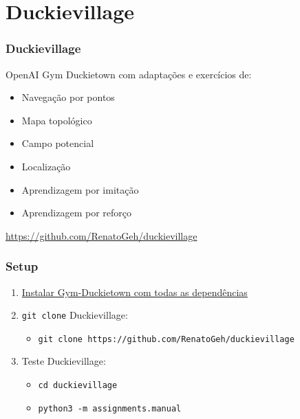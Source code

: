 \documentclass{beamer}
\begin{document}
\section{Duckievillage}

\begin{frame}
  \frametitle{Duckievillage}

  OpenAI Gym Duckietown com adaptações e exercícios de:
  \vspace{0.5cm}

  \begin{itemize}
    \item Navegação por pontos
    \item Mapa topológico
    \item Campo potencial
    \item Localização
    \item Aprendizagem por imitação
    \item Aprendizagem por reforço
  \end{itemize}
  \vspace{0.5cm}

  \url{https://github.com/RenatoGeh/duckievillage}
\end{frame}

\begin{frame}
  \frametitle{Setup}

  \begin{enumerate}
    \item \href{https://github.com/RenatoGeh/duckievillage}{Instalar Gym-Duckietown com todas as
      dependências}
    \item \texttt{git clone} Duckievillage:
      \begin{itemize}
        \item \scriptsize\texttt{git clone https://github.com/RenatoGeh/duckievillage}
      \end{itemize}
    \item Teste Duckievillage:
      \begin{itemize}
        \item \texttt{cd duckievillage}
        \item \texttt{python3 -m assignments.manual}
      \end{itemize}
  \end{enumerate}
\end{frame}
\end{document}
